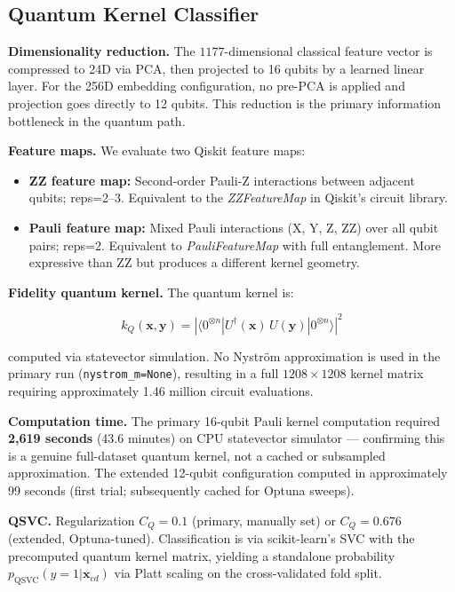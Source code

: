 \documentclass[twocolumn,10pt]{article}
\begin{document}
\subsection{Quantum Kernel Classifier}
\label{sec:qsvc}

\textbf{Dimensionality reduction.} The $1177$-dimensional classical feature vector is compressed to 24D via PCA, then projected to 16 qubits by a learned linear layer. For the 256D embedding configuration, no pre-PCA is applied and projection goes directly to 12 qubits. This reduction is the primary information bottleneck in the quantum path.

\textbf{Feature maps.} We evaluate two Qiskit \cite{qiskit2023} feature maps:
\begin{itemize}[leftmargin=*]
\item \textbf{ZZ feature map:} Second-order Pauli-Z interactions between adjacent qubits; reps=2--3. Equivalent to the \textit{ZZFeatureMap} in Qiskit's circuit library.
\item \textbf{Pauli feature map:} Mixed Pauli interactions (X, Y, Z, ZZ) over all qubit pairs; reps=2. Equivalent to \textit{PauliFeatureMap} with full entanglement. More expressive than ZZ but produces a different kernel geometry.
\end{itemize}

\textbf{Fidelity quantum kernel.} The quantum kernel is:

\begin{equation}
k_{Q}(\mathbf{x}, \mathbf{y}) = \left|\langle 0^{\otimes n} | U^\dagger(\mathbf{x})\, U(\mathbf{y}) | 0^{\otimes n} \rangle\right|^2
\label{eq:qkernel}
\end{equation}

computed via statevector simulation. No Nystr\"{o}m approximation is used in the primary run (\texttt{nystrom\_m=None}), resulting in a full $1208 \times 1208$ kernel matrix requiring approximately 1.46 million circuit evaluations.

\textbf{Computation time.} The primary 16-qubit Pauli kernel computation required \textbf{2,619 seconds} (43.6 minutes) on CPU statevector simulator --- confirming this is a genuine full-dataset quantum kernel, not a cached or subsampled approximation. The extended 12-qubit configuration computed in approximately 99 seconds (first trial; subsequently cached for Optuna sweeps).

\textbf{QSVC.} Regularization $C_{Q}=0.1$ (primary, manually set) or $C_{Q}=0.676$ (extended, Optuna-tuned). Classification is via scikit-learn's SVC with the precomputed quantum kernel matrix, yielding a standalone probability $p_{\mathrm{QSVC}}(y=1|\mathbf{x}_{cd})$ via Platt scaling on the cross-validated fold split.
\end{document}
